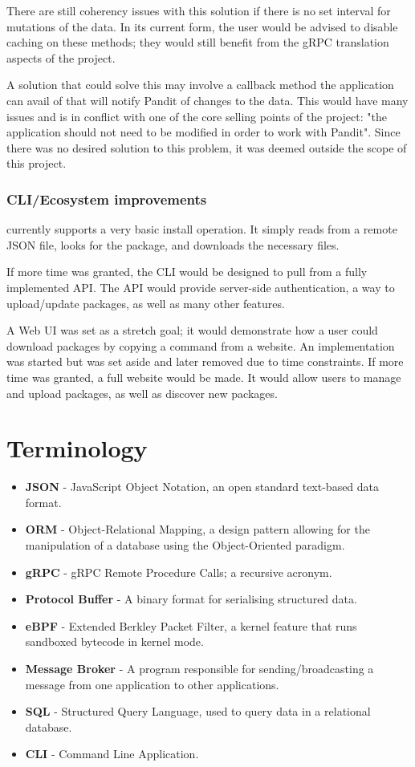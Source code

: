 \documentclass[a4paper,12pt]{report}
\begin{document}
There are still coherency issues with this solution if there is no set interval for mutations of the data.
In its current form, the user would be advised to disable caching on these methods; they would still benefit from the gRPC translation aspects of the project.

A solution that could solve this may involve a callback method the application can avail of that will notify Pandit of changes to the data.
This would have many issues and is in conflict with one of the core selling points of the project: "the application should not need to be modified in order to work with Pandit".
Since there was no desired solution to this problem, it was deemed outside the scope of this project.

\subsection{CLI/Ecosystem improvements}
 currently supports a very basic install operation. 
It simply reads from a remote JSON file, looks for the package, and downloads the necessary files.

If more time was granted, the CLI would be designed to pull from a fully implemented API. 
The API would provide server-side authentication, a way to upload/update packages, as well as many other features.

A Web UI was set as a stretch goal; it would demonstrate how a user could download packages by copying a command from a website.
An implementation was started but was set aside and later removed due to time constraints. 
If more time was granted, a full website would be made.
It would allow users to manage and upload packages, as well as discover new packages.


\medskip

\chapter*{Terminology}

\begin{itemize}
    \item \textbf{JSON} - JavaScript Object Notation, an open standard text-based data format.
    \item \textbf{ORM} - Object-Relational Mapping, a design pattern allowing for the manipulation of a database using the Object-Oriented paradigm.
    \item \textbf{gRPC} - gRPC Remote Procedure Calls; a recursive acronym.
    \item \textbf{Protocol Buffer} - A binary format for serialising structured data.
    \item \textbf{eBPF} - Extended Berkley Packet Filter, a kernel feature that runs sandboxed bytecode in kernel mode.
    \item \textbf{Message Broker} - A program responsible for sending/broadcasting a message from one application to other applications.
    \item \textbf{SQL} - Structured Query Language, used to query data in a relational database.
    \item \textbf{CLI} - Command Line Application.
\end{itemize}

\printbibliography
\end{document}

